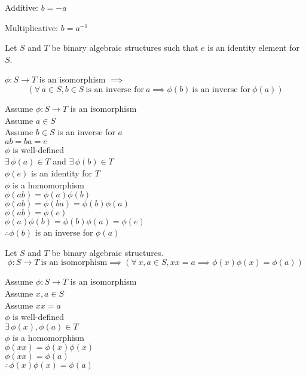 \documentclass[letterpaper,12pt,fleqn]{article}
\newcommand{\p}{\phi}
\begin{document}
\begin{notation}
  \listbreak
  \begin{description}
  \item{Additive:} $b=-a$
  \item{Multiplicative:} $b=a^{-1}$
  \end{description}
\end{notation}

\begin{theorem}
  Let $S$ and $T$ be binary algebraic structures such that $e$ is an identity
  element for $S$.
  
  $\p:S\to T$ is an isomorphism $\implies$
  \[\left(\forall\,a\in S,b\in S\ \mbox{is an inverse for}\ a\implies
  \p(b)\ \mbox{is an inverse for}\ \p(a)\right)\]
\end{theorem}

\begin{theproof}
  Assume $\p:S\to T$ is an isomorphism \\
  Assume $a\in S$ \\
  Assume $b\in S$ is an inverse for $a$ \\
  $ab=ba=e$ \\
  $\p$ is well-defined \\
  $\exists\,\p(a)\in T$ and $\exists\,\p(b)\in T$ \\
  $\p(e)$ is an identity for $T$ \\
  $\p$ is a homomorphism \\
  $\p(ab)=\p(a)\p(b)$ \\
  $\p(ab)=\p(ba)=\p(b)\p(a)$ \\
  $\p(ab)=\p(e)$ \\
  $\p(a)\p(b)=\p(b)\p(a)=\p(e)$ \\
  $\therefore \p(b)$ is an inverse for $\p(a)$
\end{theproof}

\begin{theorem}
  Let $S$ and $T$ be binary algebraic structures.
  \[\p:S\to T\ \mbox{is an isomorphism}\implies
    \left(\forall\,x,a\in S,xx=a\implies\p(x)\p(x)=\p(a)\right)\]
\end{theorem}

\begin{theproof}
  Assume $\p:S\to T$ is an isomorphism \\
  Assume $x,a\in S$ \\
  Assume $xx=a$ \\
  $\p$ is well-defined \\
  $\exists\,\p(x),\p(a)\in T$ \\
  $\p$ is a homomorphism \\
  $\p(xx)=\p(x)\p(x)$ \\
  $\p(xx)=\p(a)$ \\
  $\therefore \p(x)\p(x)=\p(a)$ \\
\end{theproof}
\end{document}

